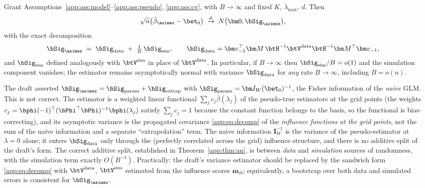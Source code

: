 \begin{theorem}\label{app:thm:an}
Grant Assumptions~\ref{app:ass:model}--\ref{app:ass:pseudo}, \ref{app:ass:cv}, with
$B\to\infty$ and fixed $K$, $\lambda_{\max}$, $d$. Then
\[
  \sqrt n\bigl(\hat\beta_{\asimex}-\bet_0\bigr)
  \;\xrightarrow{d}\;N\bigl(\bm 0,\bSig_{\asimex}\bigr),
\]
with the exact decomposition
\begin{equation}\label{app:eq:decomp}
  \bSig_{\asimex}
  \;=\;\bSig_{\mathrm{data}}\;+\;\tfrac1B\,\bSig_{\mathrm{sim}},
  \qquad
  \bSig_{\mathrm{data}}=\bm v_{-1}^\top\bm M\,
    \btH^{-1}\btV^{\mathrm{data}}\btH^{-1}\bm M^\top\bm v_{-1},
\end{equation}
and $\bSig_{\mathrm{sim}}$ defined analogously with
$\btV^{\mathrm{sim}}$ in place of $\btV^{\mathrm{data}}$. In particular,
if $B\to\infty$ then $\bSig_{\mathrm{sim}}/B=o(1)$ and the simulation
component vanishes; the estimator remains asymptotically normal with
variance $\bSig_{\mathrm{data}}$ for \emph{any} rate $B\to\infty$,
including $B=o(n)$.
\end{theorem}

\begin{remark}\label{app:rem:decomp}
The draft asserted
$\bSig_{\asimex}=\bSig_{\mathrm{param}}+\bSig_{\mathrm{extrap}}$ with
$\bSig_{\mathrm{param}}=\bm I_W(\bet_0)^{-1}$, the Fisher information of
the \emph{naive} GLM. This is not correct. The \asimex{} estimator is a
weighted linear functional $\sum_j c_j\bar\beta(\lambda_j)$ of the
pseudo-true estimators at the grid points (the weights
$c_j=\bphi(-1)^\top(\bPhi^\top\bPhi)^{-1}\bphi(\lambda_j)$ satisfy
$\sum_j c_j=1$ because the constant function belongs to the basis, so the
functional is bias-correcting), and its asymptotic variance is the
propagated covariance \eqref{app:eq:decomp} of the \emph{influence functions
at the grid points}, not the sum of the naive information and a separate
``extrapolation'' term. The naive information $\bm I_W^{-1}$ is the
variance of the pseudo-estimator at $\lambda=0$ alone; it enters
$\bSig_{\mathrm{data}}$ only through the (perfectly correlated across the
grid) influence structure, and there is no additive split of the
draft's form. The correct additive split, established in
Theorem~\ref{app:thm:an}, is between \emph{data} and \emph{simulation}
sources of randomness, with the simulation term exactly $O(B^{-1})$.
Practically: the draft's variance estimator should be replaced by the
sandwich form \eqref{app:eq:decomp} with $\btV^{\mathrm{data}}$,
$\btV^{\mathrm{sim}}$ estimated from the influence scores
$\bm m_{ib}$; equivalently, a bootstrap over both data and simulated
errors is consistent for $\bSig_{\asimex}$.
\end{remark}

